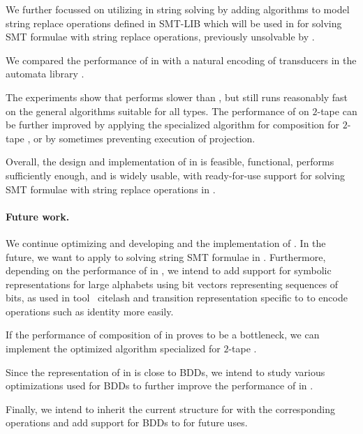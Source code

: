 We further focussed on utilizing \nfts in string solving by adding algorithms to model string replace operations defined in SMT-LIB which will be used in \noodler for solving SMT formulae with string replace operations, previously unsolvable by \noodler.

We compared the performance of \nfts in \mata with a natural encoding of transducers in the automata library \mona.

The experiments show that \mata performs slower than \mona, but still runs reasonably fast on the general algorithms suitable for all \nft types.
The performance of \mata on $2$-tape \nfts can be further improved by applying the specialized algorithm for composition for $2$-tape \nfts, or by sometimes preventing execution of projection.

Overall, the design and implementation of \nfts in \mata is feasible, functional, performs sufficiently enough, and is widely usable, with ready-for-use support for solving SMT formulae with string replace operations in \noodler.

\paragraph{Future work.}
We continue optimizing and developing \mata and the implementation of \nfts.
In the future, we want to apply \nfts to solving string SMT formulae in \noodler.
Furthermore, depending on the performance of \nfts in \noodler, we intend to add support for symbolic representations for large alphabets using bit vectors representing sequences of bits, as used in tool \lash~cite{lash} and transition representation specific to \nfts to encode \nft operations such as identity more easily.

If the performance of composition of \nfts in \noodler proves to be a bottleneck, we can implement the optimized algorithm specialized for $2$-tape \nfts.

Since the representation of \nfts in \mata is close to BDDs, we intend to study various optimizations used for BDDs to further improve the performance of \nfts in \mata.

Finally, we intend to inherit the current structure for \nfts with the corresponding operations and add support for BDDs to \mata for future uses.



% 
